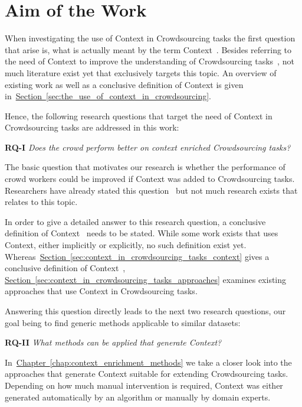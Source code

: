 \section{Aim of the Work}
When investigating the use of Context in Crowdsourcing tasks the first question that arise is, what is actually
meant by the term \guillemotright Context\guillemotleft~. Besides referring to the need of Context to improve the understanding
of Crowdsourcing tasks~\cite{sarasua2015crowdsourcing}, not much literature exist yet that exclusively targets this topic. An overview
of existing work as well as a conclusive definition of Context is given in~\hyperref[sec:the_use_of_context_in_crowdsourcing]{Section~\ref*{sec:the_use_of_context_in_crowdsourcing}}.

Hence, the following research questions that target the need of Context in Crowdsourcing tasks are addressed in this work:

\textbf{RQ-I} \emph{Does the crowd perform better on context enriched Crowdsourcing tasks?}

The basic question that motivates our research is whether the performance of crowd workers could be improved if Context was added
to Crowdsourcing tasks. Researchers have already stated this question~\cite{sarasua2015crowdsourcing} but not much research exists that relates to this topic. 

In order to give a detailed answer to this research question, a conclusive definition of \guillemotright Context\guillemotleft~ needs to be stated. While some work exists that uses Context, either implicitly or explicitly, no such definition exist yet. Whereas~\hyperref[sec:context_in_crowdsourcing_tasks_context]{Section~\ref*{sec:context_in_crowdsourcing_tasks_context}} gives a conclusive definition of \guillemotright Context\guillemotleft~, \hyperref[sec:context_in_crowdsourcing_tasks_approaches]{Section~\ref*{sec:context_in_crowdsourcing_tasks_approaches}} examines existing approaches that use Context in Crowdsourcing tasks. 

Answering this question directly leads to the next two research questions, our goal being to find generic methods applicable to similar
datasets:

\textbf{RQ-II} \emph{What methods can be applied that generate Context?}

In~\hyperref[chap:context_enrichment_methods]{Chapter~\ref*{chap:context_enrichment_methods}} we take a closer look into the approaches that generate Context suitable for extending Crowdsourcing tasks. Depending on how much manual intervention is required, Context was either generated automatically by an algorithm or manually by domain experts. 

